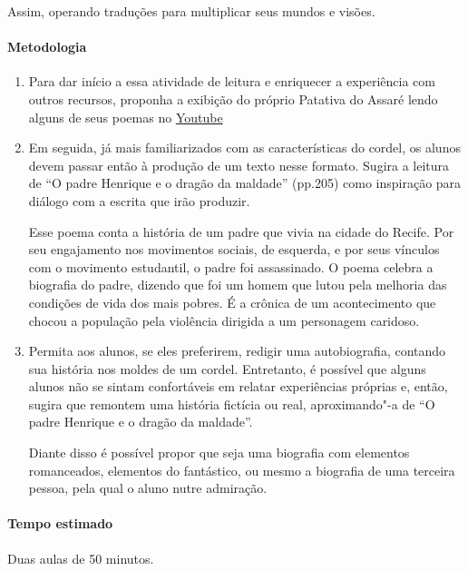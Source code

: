 \documentclass[12pt]{extarticle}
\begin{document}
Assim, operando traduções para multiplicar seus mundos e visões.

\paragraph{Metodologia}

\begin{enumerate}
\item
Para dar início a essa atividade de leitura e enriquecer a experiência com outros recursos, 
proponha a exibição do próprio Patativa do Assaré lendo alguns
de seus poemas no \href{https://www.youtube.com/watch?v=RTEfYnMNNpc&ab_channel=IrandiHolanda}{Youtube}

\item
Em seguida, já mais familiarizados com as características do cordel, os
alunos devem passar então à produção de um texto nesse formato. Sugira a 
leitura de ``O padre Henrique e o dragão da maldade'' (pp.205) como 
inspiração para diálogo com a escrita que irão produzir. 

Esse poema conta a história de um padre que vivia na cidade
do Recife. Por seu engajamento nos movimentos sociais, de
esquerda, e por seus vínculos com o movimento estudantil,
o padre foi assassinado. O poema celebra a biografia do
padre, dizendo que foi um homem que lutou pela melhoria
das condições de vida dos mais pobres. É a crônica de
um acontecimento que chocou a população pela violência
dirigida a um personagem caridoso.

\item
Permita aos alunos, se eles preferirem, redigir uma autobiografia, contando
sua história nos moldes de um cordel. Entretanto, é possível que alguns
alunos não se sintam confortáveis em relatar experiências próprias e, então,
sugira que remontem uma história fictícia ou real, aproximando"-a de 
``O padre Henrique e o dragão da maldade''.

Diante disso é possível propor que seja uma biografia com elementos
romanceados, elementos do fantástico, ou mesmo a biografia de uma
terceira pessoa, pela qual o aluno nutre admiração. 

\end{enumerate}

\paragraph{Tempo estimado} Duas aulas de 50 minutos. 
\end{document}
